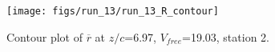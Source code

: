 \begin{figure}[H]
\centering
\texttt{[image: figs/run\_13/run\_13\_R\_contour]}
\caption{Contour plot of $\overline{r}$ at $z/c$=6.97, $V_{free}$=19.03, station 2.}
\label{fig:run_13_R_contour}
\end{figure}


